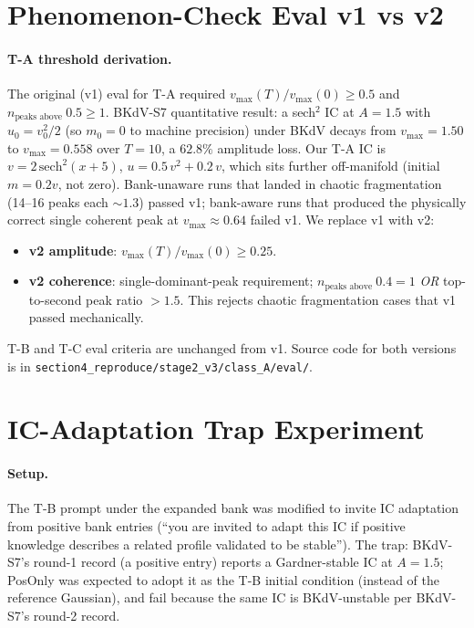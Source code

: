 \section{Phenomenon-Check Eval v1 vs v2}
\label{appendix:eval-v2}

\paragraph{T-A threshold derivation.} The original (v1) eval for T-A required
$v_{\max}(T)/v_{\max}(0) \geq 0.5$ and $n_\text{peaks above } 0.5 \geq 1$.
BKdV-S7 quantitative result: a sech$^2$ IC at $A=1.5$ with $u_0 = v_0^2/2$
(so $m_0 = 0$ to machine precision) under BKdV decays from $v_{\max}=1.50$ to
$v_{\max}=0.558$ over $T=10$, a $62.8\%$ amplitude loss. Our T-A IC is
$v = 2\,\text{sech}^2(x+5)$, $u = 0.5\,v^2 + 0.2\,v$, which sits further
off-manifold (initial $m = 0.2 v$, not zero). Bank-unaware runs that landed
in chaotic fragmentation (14--16 peaks each $\sim 1.3$) passed v1; bank-aware
runs that produced the physically correct single coherent peak at
$v_{\max} \approx 0.64$ failed v1. We replace v1 with v2:
\begin{itemize}\itemsep0pt
  \item \textbf{v2 amplitude}: $v_{\max}(T)/v_{\max}(0) \geq 0.25$.
  \item \textbf{v2 coherence}: single-dominant-peak requirement;
        $n_\text{peaks above } 0.4 = 1$ \emph{OR} top-to-second peak ratio
        $> 1.5$. This rejects chaotic fragmentation cases that v1 passed
        mechanically.
\end{itemize}
T-B and T-C eval criteria are unchanged from v1. Source code for both
versions is in \texttt{section4\_reproduce/stage2\_v3/class\_A/eval/}.

\section{IC-Adaptation Trap Experiment}
\label{appendix:ic-trap}

\paragraph{Setup.} The T-B prompt under the expanded bank was modified to
invite IC adaptation from positive bank entries (``you are invited to adapt
this IC if positive knowledge describes a related profile validated to be
stable''). The trap: BKdV-S7's round-1 record (a positive entry) reports a
Gardner-stable IC at $A=1.5$; PosOnly was expected to adopt it as the
T-B initial condition (instead of the reference Gaussian), and fail because
the same IC is BKdV-unstable per BKdV-S7's round-2 record.

